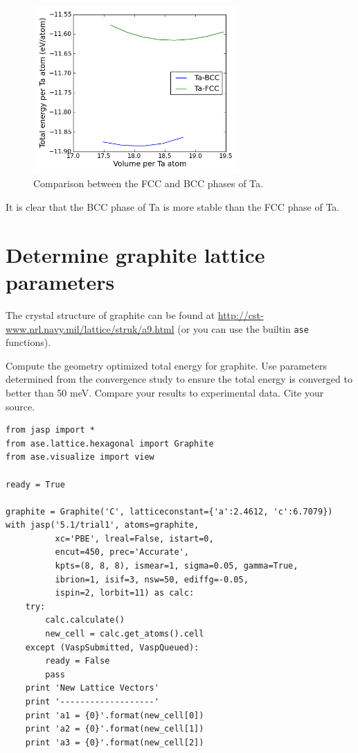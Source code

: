 \documentclass[11pt]{article}
\begin{document}
\begin{figure}[H]
\centering
\includegraphics[width=0.7\textwidth]{./4-3.png}
\caption{Comparison between the FCC and BCC phases of Ta.}
\end{figure}

It is clear that the BCC phase of Ta is more stable than the FCC phase of Ta.
\section{Determine graphite lattice parameters}
\label{sec-5}

The crystal structure of graphite can be found at \href{http://cst-www.nrl.navy.mil/lattice/struk/a9.html}{http://cst-www.nrl.navy.mil/lattice/struk/a9.html} (or you can use the builtin \texttt{ase} functions).

Compute the geometry optimized total energy for graphite. Use parameters determined from the convergence study to ensure the total energy is converged to better than 50 meV. Compare your results to experimental data. Cite your source.


\begin{verbatim}
from jasp import *
from ase.lattice.hexagonal import Graphite
from ase.visualize import view

ready = True

graphite = Graphite('C', latticeconstant={'a':2.4612, 'c':6.7079})
with jasp('5.1/trial1', atoms=graphite,
          xc='PBE', lreal=False, istart=0,
          encut=450, prec='Accurate',
          kpts=(8, 8, 8), ismear=1, sigma=0.05, gamma=True,
          ibrion=1, isif=3, nsw=50, ediffg=-0.05, 
          ispin=2, lorbit=11) as calc:
    try:
        calc.calculate()
        new_cell = calc.get_atoms().cell
    except (VaspSubmitted, VaspQueued):
        ready = False
        pass
    print 'New Lattice Vectors'
    print '-------------------'
    print 'a1 = {0}'.format(new_cell[0])
    print 'a2 = {0}'.format(new_cell[1])
    print 'a3 = {0}'.format(new_cell[2])
\end{verbatim}
\end{document}
